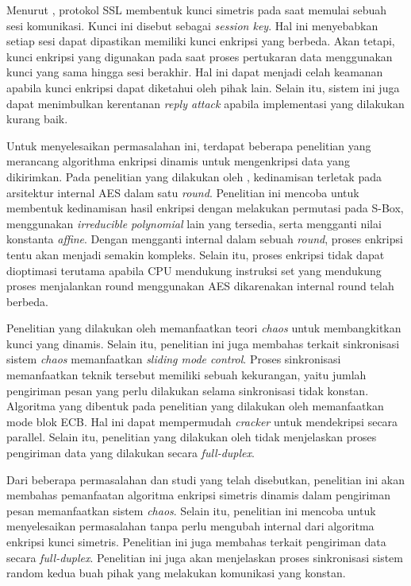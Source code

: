 Menurut \textcite{munir2019}, protokol SSL membentuk kunci simetris pada saat memulai sebuah sesi komunikasi. Kunci ini disebut sebagai \emph{session key}. Hal ini menyebabkan setiap sesi dapat dipastikan memiliki kunci enkripsi yang berbeda. Akan tetapi, kunci enkripsi yang digunakan pada saat proses pertukaran data menggunakan kunci yang sama hingga sesi berakhir. Hal ini dapat menjadi celah keamanan apabila kunci enkripsi dapat diketahui oleh pihak lain. Selain itu, sistem ini juga dapat menimbulkan kerentanan \emph{reply attack} apabila implementasi yang dilakukan kurang baik.

Untuk menyelesaikan permasalahan ini, terdapat beberapa penelitian yang merancang algorithma enkripsi dinamis untuk mengenkripsi data yang dikirimkan. Pada penelitian yang dilakukan oleh \textcite{singh2019}, kedinamisan terletak pada arsitektur internal AES dalam satu \emph{round}. Penelitian ini mencoba untuk membentuk kedinamisan hasil enkripsi dengan melakukan permutasi pada S-Box, menggunakan \emph{irreducible polynomial} lain yang tersedia, serta mengganti nilai konstanta \emph{affine}. Dengan mengganti internal dalam sebuah \emph{round}, proses enkripsi tentu akan menjadi semakin kompleks. Selain itu, proses enkripsi tidak dapat dioptimasi terutama apabila CPU mendukung instruksi set yang mendukung proses menjalankan round menggunakan AES dikarenakan internal round telah berbeda.

Penelitian yang dilakukan oleh \textcite{lin2021} memanfaatkan teori \emph{chaos} untuk membangkitkan kunci yang dinamis. Selain itu, penelitian ini juga membahas terkait sinkronisasi sistem \emph{chaos} memanfaatkan \emph{sliding mode control}. Proses sinkronisasi memanfaatkan teknik tersebut memiliki sebuah kekurangan, yaitu jumlah pengiriman pesan yang perlu dilakukan selama sinkronisasi tidak konstan. Algoritma yang dibentuk pada penelitian yang dilakukan oleh \textcite{lin2021} memanfaatkan mode blok ECB. Hal ini dapat mempermudah \emph{cracker} untuk mendekripsi secara parallel. Selain itu, penelitian yang dilakukan oleh \textcite{lin2021} tidak menjelaskan proses pengiriman data yang dilakukan secara \emph{full-duplex}.

Dari beberapa permasalahan dan studi yang telah disebutkan, penelitian ini akan membahas pemanfaatan algoritma enkripsi simetris dinamis dalam pengiriman pesan memanfaatkan sistem \emph{chaos}. Selain itu, penelitian ini mencoba untuk menyelesaikan permasalahan tanpa perlu mengubah internal dari algoritma enkripsi kunci simetris. Penelitian ini juga membahas terkait pengiriman data secara \emph{full-duplex}. Penelitian ini juga akan menjelaskan proses sinkronisasi sistem random kedua buah pihak yang melakukan komunikasi yang konstan.

